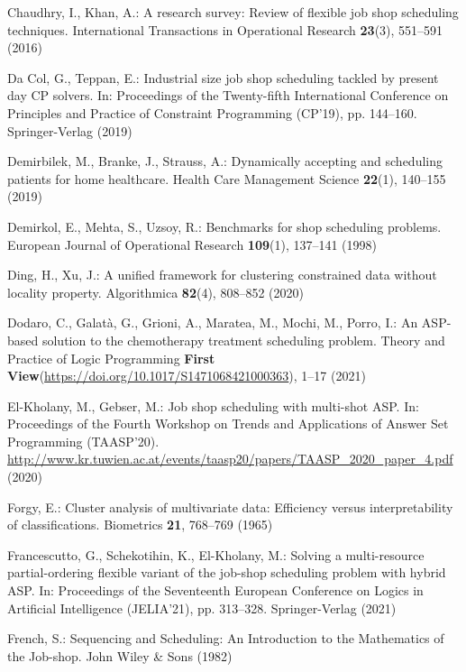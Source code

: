 \begin{thebibliography}{10}
Chaudhry, I., Khan, A.: A research survey: Review of flexible job shop
  scheduling techniques. International Transactions in Operational Research
  \textbf{23}(3),  551--591 (2016)

{Da Col}, G., Teppan, E.: Industrial size job shop scheduling tackled by
  present day {CP} solvers. In: Proceedings of the Twenty-fifth International
  Conference on Principles and Practice of Constraint Programming (CP'19), pp.
  144--160. Springer-Verlag (2019)

Demirbilek, M., Branke, J., Strauss, A.: Dynamically accepting and scheduling
  patients for home healthcare. Health Care Management Science  \textbf{22}(1),
   140--155 (2019)

Demirkol, E., Mehta, S., Uzsoy, R.: Benchmarks for shop scheduling problems.
  European Journal of Operational Research  \textbf{109}(1),  137--141 (1998)

Ding, H., Xu, J.: A unified framework for clustering constrained data without
  locality property. Algorithmica  \textbf{82}(4),  808--852 (2020)

Dodaro, C., Galat{\`{a}}, G., Grioni, A., Maratea, M., Mochi, M., Porro, I.: An
  {ASP}-based solution to the chemotherapy treatment scheduling problem. Theory
  and Practice of Logic Programming  \textbf{First
  View}(\url{https://doi.org/10.1017/S1471068421000363}),  1--17 (2021)

El-Kholany, M., Gebser, M.: Job shop scheduling with multi-shot {ASP}. In:
  Proceedings of the Fourth Workshop on Trends and Applications of Answer Set
  Programming (TAASP'20).
  \url{http://www.kr.tuwien.ac.at/events/taasp20/papers/TAASP_2020_paper_4.pdf}
  (2020)

Forgy, E.: Cluster analysis of multivariate data: Efficiency versus
  interpretability of classifications. Biometrics  \textbf{21},  768--769
  (1965)

Francescutto, G., Schekotihin, K., El{-}Kholany, M.: Solving a multi-resource
  partial-ordering flexible variant of the job-shop scheduling problem with
  hybrid {ASP}. In: Proceedings of the Seventeenth European Conference on
  Logics in Artificial Intelligence (JELIA'21), pp. 313--328. Springer-Verlag
  (2021)

French, S.: Sequencing and Scheduling: An Introduction to the Mathematics of
  the Job-shop. John Wiley \& Sons (1982)


\end{thebibliography}
